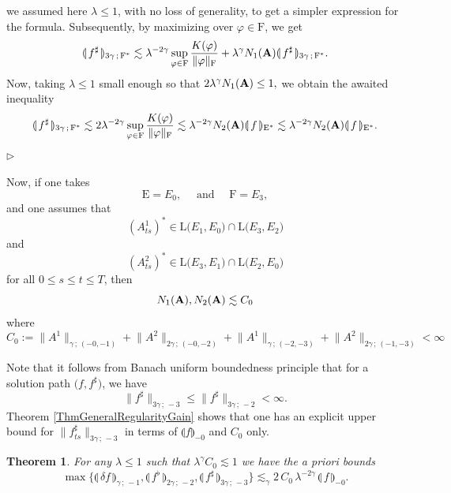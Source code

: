 \documentclass[11pt,a4paper]{amsart}
\renewcommand{\leq}{\leqslant}
\newcommand{\ssk}{\smallskip}
\newtheorem{thm}{\hspace{-0.15cm}  {\sc Theorem} } %
\numberwithin{equation}{section} %
\newenvironment{Dem}{%
    \begin{list}{\hspace{0.5cm}{\sc Proof --}}{%
        \setlength{\topsep}{0pt}%
        \setlength{\leftmargin}{0pt}%
        \setlength{\rightmargin}{0pt}%
        \setlength{\listparindent}{0pt}%
        \setlength{\itemindent}{0pt}%
        \setlength{\parsep}{0pt}%
        \addtolength{\leftmargin}{20pt}%
        \addtolength{\rightmargin}{0pt}%
    } \item }{\hfill{\space $\rhd$}\end{list}\smallskip}
\begin{document}
\begin{Dem}
we assumed here $\lambda \leq 1$, with no loss of generality, to get a simpler expression for the formula. Subsequently, by maximizing over $\varphi \in \textrm{F}$, we get
$$
\llparenthesis\, f^\sharp \,\rrparenthesis_{3\gamma\,;\,\textrm{F}^*} \lesssim \lambda^{-2\gamma} \sup_{\varphi \in \textrm{F}} \frac{K(\varphi)}{\|\varphi\|_\textrm{F}} + \lambda^{\gamma} N_1({\bf A}) 
\llparenthesis\, f^\sharp \,\rrparenthesis_{3\gamma\,;\,\textrm{F}^*}.
$$
Now, taking $\lambda\le 1$ small enough so that
$
2\lambda^{\gamma} N_1({\bf A}) \le 1,
$
we obtain the awaited inequality
$$
\llparenthesis\, f^\sharp \,\rrparenthesis_{3\gamma\,;\,\textrm{F}^*} \lesssim 2 \lambda^{-2\gamma} \sup_{\varphi \in \textrm{F}} \frac{K(\varphi)}{\|\varphi\|_\textrm{F}} \lesssim \lambda^{-2\gamma} N_2({\bf A}) \llparenthesis\, f\,\rrparenthesis_{\textrm{E}^*}  \lesssim \lambda^{-2\gamma} N_2({\bf A})\llparenthesis\, f\,\rrparenthesis_{\textrm{E}^*}.
$$
\end{Dem}

\bigskip

Now, if one takes 
$$
\textrm{E} = E_0, \quad \textrm{ and }\quad \textrm{F} = E_3,
$$ 
and one assumes that 
$$
(A^1_{ts})^* \in \textrm{L}\big(E_1,E_0\big) \cap \textrm{L}\big(E_3,E_2\big)
$$ 
and 
$$
(A^2_{ts})^* \in \textrm{L}\big(E_3 , E_1\big) \cap \textrm{L}\big(E_2,E_0\big)
$$ 
for all $0\leq s\leq t\leq T$, then 
$$
N_1({\bf A}), N_2({\bf A}) \lesssim C_0
$$ 
where
\begin{equation}
\label{EqDefnC0}
C_0 := \big\|A^1\big\|_{\gamma\,;\,(-0,-1)}  + \big\|A^2\big\|_{2\gamma\,;\,(-0,-2)} +  \big\|A^1\big\|_{\gamma\,;\,(-2,-3)}  + \big\|A^2\big\|_{2\gamma\,;\,(-1,-3)}  < \infty
\end{equation}

\ssk

Note that it follows from Banach uniform boundedness principle that for a solution path $\big(f,f^\sharp\big)$, we have
$$
\big\| f^\sharp\big\|_{3\gamma\,;\,-3} \leq \big\| f^\sharp\big\|_{3\gamma\,;\,-2} < \infty.
$$
Theorem \ref{ThmGeneralRegularityGain} shows that one has an explicit upper bound for $\big\| f^\sharp_{ts}\big\|_{3\gamma\,;\,-3}$ in terms of $ \llparenthesis f\rrparenthesis_{-0}$ and $C_0$ only. 

\begin{thm}
\label{ThmRegularityGain} 
For any $\lambda \le 1$ such that $\lambda^\gamma C_0 \lesssim 1$ we have the a priori bounds
\begin{equation}
\label{EqFundamentalAPrioriEstimate}
\max\Big\{  \llparenthesis\, \delta f \,\rrparenthesis_{\gamma\,;\, - 1} , \llparenthesis\, f^\flat \,\rrparenthesis_{2 \gamma\,;\, - 2}, \llparenthesis\, f^\sharp \,\rrparenthesis_{3 \gamma\,;\, - 3} \Big\} \lesssim_{\gamma} 2\,C_0\,\lambda^{-2\gamma}\,\llparenthesis\, f\,\rrparenthesis_{-0} .
\end{equation}
\end{thm}
\end{document}

